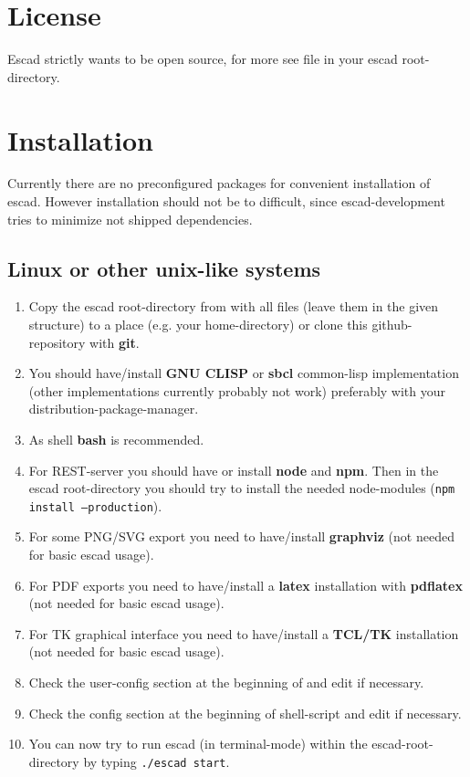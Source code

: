 \documentclass[a4paper, 12pt, openany]{scrbook}
\begin{document}
\section{License}
Escad strictly wants to be open source, for more see file  in your escad root-directory.
\section{Installation}
Currently there are no preconfigured packages for convenient installation of escad. However installation should not be to difficult, since escad-development tries to minimize not shipped dependencies.
\subsection{Linux or other unix-like systems}
\begin{enumerate}
\item Copy the escad root-directory from  with all files (leave them in the given structure) to a place (e.g. your home-directory) or clone this github-repository with \textbf{git}.
\item You should have/install \textbf{GNU CLISP} or \textbf{sbcl} common-lisp implementation (other implementations currently probably not work) preferably with your distribution-package-manager.
\item As shell \textbf{bash} is recommended.
\item For REST-server you should have or install \textbf{node} and \textbf{npm}. Then in the escad root-directory you should try to install the needed node-modules (\texttt{npm install --production}).
\item For some PNG/SVG export you need to have/install \textbf{graphviz} (not needed for basic escad usage).
\item For PDF exports you need to have/install a \textbf{latex} installation with \textbf{pdflatex} (not needed for basic escad usage).
\item For TK graphical interface you need to have/install a \textbf{TCL/TK} installation (not needed for basic escad usage).
\item Check the user-config section at the beginning of  and edit if necessary.
\item Check the config section at the beginning of shell-script  and edit if necessary.
\item You can now try to run escad (in terminal-mode) within the escad-root-directory by typing \texttt{./escad start}.
\end{enumerate}
\end{document}
